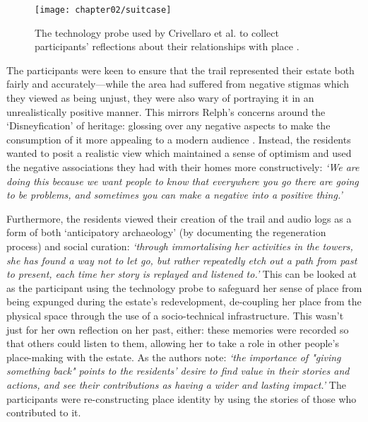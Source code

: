 \begin{figure}
\texttt{[image: chapter02/suitcase]}
\caption{The technology probe used by Crivellaro et al. to collect participants' reflections about their relationships with place \citep{Crivellaro2016}.}
\label{fig:suitcase} \end{figure}

The participants were keen to ensure that the trail represented their estate both fairly and accurately---while the area had suffered from negative stigmas which they viewed as being unjust, they were also wary of portraying it in an unrealistically positive manner. This mirrors Relph's concerns around the `Disneyfication' of heritage: glossing over any negative aspects to make the consumption of it more appealing to a modern audience \citep{Relph2018}. Instead, the residents wanted to posit a realistic view which maintained a sense of optimism and used the negative associations they had with their homes more constructively: \textit{`We are doing this because we want people to know that everywhere you go there are going to be problems, and sometimes you can make a negative into a positive thing.'}

Furthermore, the residents viewed their creation of the trail and audio logs as a form of both `anticipatory archaeology' (by documenting the regeneration process) and social curation: \textit{`through immortalising her activities in the towers, she has found a way not to let go, but rather repeatedly etch out a path from past to present, each time her story is replayed and listened to.'} This can be looked at as the participant using the technology probe to safeguard her sense of place from being expunged during the estate's redevelopment, de-coupling her place from the physical space through the use of a socio-technical infrastructure. This wasn't just for her own reflection on her past, either: these memories were recorded so that others could listen to them, allowing her to take a role in other people's place-making with the estate. As the authors note: \textit{`the importance of "giving something back" points to the residents' desire to find value in their stories and actions, and see their contributions as having a wider and lasting impact.'} The participants were re-constructing place identity by using the stories of those who contributed to it.

